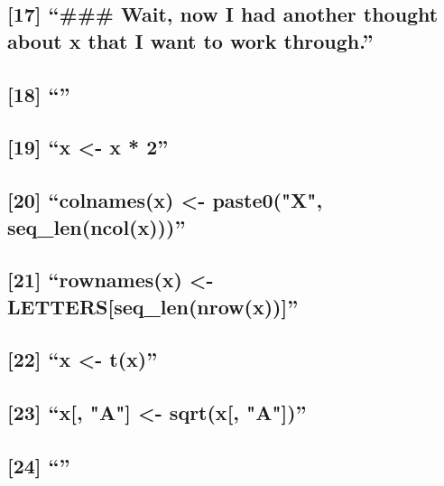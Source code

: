 \documentclass[]{article}
\begin{document}
\subsection{\texorpdfstring{{[}17{]} ``\#\#\# Wait, now I had another
thought about x that I want to work
through.''}{{[}17{]} \#\#\# Wait, now I had another thought about x that I want to work through.}}\label{wait-now-i-had-another-thought-about-x-that-i-want-to-work-through.}

\subsection{\texorpdfstring{{[}18{]} ``''}{{[}18{]} }}\label{section-3}

\subsection{\texorpdfstring{{[}19{]} ``x \textless{}- x *
2''}{{[}19{]} x \textless{}- x * 2}}\label{x---x-2-1}

\subsection{\texorpdfstring{{[}20{]} ``colnames(x) \textless{}-
paste0("X",
seq\_len(ncol(x)))''}{{[}20{]} colnames(x) \textless{}- paste0("X", seq\_len(ncol(x)))}}\label{colnamesx---paste0x-seq_lenncolx}

\subsection{\texorpdfstring{{[}21{]} ``rownames(x) \textless{}-
LETTERS{[}seq\_len(nrow(x)){]}''}{{[}21{]} rownames(x) \textless{}- LETTERS{[}seq\_len(nrow(x)){]}}}\label{rownamesx---lettersseq_lennrowx}

\subsection{\texorpdfstring{{[}22{]} ``x \textless{}-
t(x)''}{{[}22{]} x \textless{}- t(x)}}\label{x---tx}

\subsection{\texorpdfstring{{[}23{]} ``x{[}, "A"{]} \textless{}-
sqrt(x{[},
"A"{]})''}{{[}23{]} x{[}, "A"{]} \textless{}- sqrt(x{[}, "A"{]})}}\label{x-a---sqrtx-a}

\subsection{\texorpdfstring{{[}24{]} ``''}{{[}24{]} }}\label{section-4}
\end{document}
